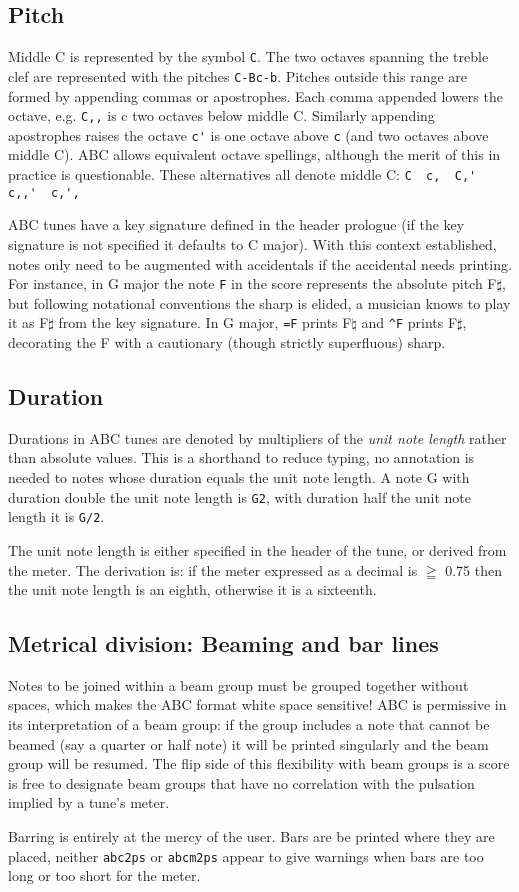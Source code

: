 \documentclass{article}
\begin{document}
\subsection{Pitch}
Middle C is represented by the symbol \verb+C+.
The two octaves spanning the treble clef are represented
with the pitches \verb+C-Bc-b+. Pitches outside this range are 
formed by appending commas or apostrophes. Each comma appended 
lowers the octave, e.g. \verb+C,,+ is c two octaves below middle 
C. Similarly appending apostrophes raises the octave \verb+c'+ 
is one octave above \verb+c+ (and two octaves above middle C). 
ABC allows equivalent octave spellings, although the merit of 
this in practice is questionable. These alternatives all denote 
middle C: \verb+C  c,  C,'  c,,'  c,',+

ABC tunes have a key signature defined in the header prologue 
(if the key signature is not specified it defaults to C major).
With this context established, notes only need to be augmented 
with accidentals if the accidental needs printing. For instance, 
in G major the note \verb+F+ in the score represents the 
absolute pitch F$\sharp$, but following notational conventions 
the sharp is elided, a musician knows to play it as 
F$\sharp$ from the key signature. In G major, \verb+=F+ prints 
F$\natural$ and \verb+^F+ prints F$\sharp$, decorating the F 
with a cautionary (though strictly superfluous) sharp. 

\subsection{Duration}
Durations in ABC tunes are denoted by multipliers of the 
\emph{unit note length} rather than absolute values. This is a 
shorthand to reduce typing, no annotation is needed to notes 
whose duration equals the unit note length. A note G with 
duration double the unit note length is \verb+G2+, with duration 
half the unit note length it is \verb+G/2+.

The unit note length is either specified in the header of the 
tune, or derived from the meter. The derivation is: 
if the meter expressed as a decimal is $\geqq$ 0.75 then the 
unit note length is an eighth, otherwise it is a sixteenth.

\subsection{Metrical division: Beaming and bar lines}
Notes to be joined within a beam group must be grouped together
without spaces, which makes the ABC format white space sensitive!
ABC is permissive in its interpretation of a beam group: if the 
group includes a note that cannot be beamed (say a quarter or half
note) it will be printed singularly and the beam group will be 
resumed. The flip side of this flexibility with beam groups is a
score is free to designate beam groups that have no correlation  
with the pulsation implied by a tune's meter.

Barring is entirely at the mercy of the user. Bars are be printed 
where they are placed, neither \verb+abc2ps+ or \verb+abcm2ps+ 
appear to give warnings when bars are too long or too short for 
the meter.
\end{document}
